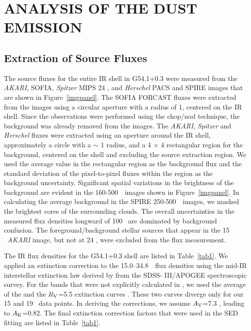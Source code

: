 \documentclass{emulateapj}
\newcommand{\spitzer}{\textit{Spitzer }}
\newcommand{\herschel}{\textit{Herschel }}
\begin{document}
\section{ANALYSIS OF THE DUST EMISSION}\label{analysis}

\subsection{Extraction of Source Fluxes}

The source fluxes for the entire IR shell in G54.1+0.3 were measured from the \textit{AKARI}, SOFIA, \spitzer MIPS 24 \micron, and \herschel PACS and SPIRE images that are shown in Figure~\ref{imgpanel}. The SOFIA FORCAST fluxes were extracted from the images using a circular aperture with a radius of 1, centered on the IR shell. Since the observations were performed using the chop/nod technique, the background was already removed from the images. The \textit{AKARI}, \spitzer and \herschel fluxes were extracted using an aperture around the IR shell, approximately a circle with a $\sim$ 1 radius, and a 4 $\times$ 4 rectangular region for the background, centered on the shell and excluding the source extraction region. We used the average value in the rectangular region as the background flux and the standard deviation of the pixel-to-pixel fluxes within the region as the background uncertainty. Significant spatial variations in the brightness of the background are evident in the 160-500~\micron\ images shown in Figure~\ref{imgpanel}. In calculating the average background in the SPIRE 250-500~\micron\ images, we masked the brightest cores of the surrounding clouds. The overall uncertainties in the measured flux densities longward of 100 \micron\ are dominated by background confusion. The foreground/background stellar sources that appear in the 15 \micron\ \textit{AKARI} image, but not at 24 \micron, were excluded from the flux measurement.

The IR flux densities for the G54.1+0.3 shell are listed in Table~\ref{tab1}. We applied an extinction correction to the 15.0--34.8~\micron\ flux densities using the mid-IR interstellar extinction law derived by \citet{xue16} from the SDSS- III/APOGEE spectroscopic survey. For the bands that were not explicitly calculated in \citet{xue16}, we used the average of the \citet{wang15} and the \citet{weingartner01} $R_{\rm V}$=5.5 extinction curves \citep[see Figure~18 of][]{xue16}. These two curves diverge only for our 15 and 19 \micron\ data points. In deriving the corrections, we assume $A_{\rm V}$=7.3 \citep{kim13}, leading to $A_{\rm K}$=0.82. The final extinction correction factors that were used in the SED fitting are listed in Table~\ref{tab1}.
\end{document}
